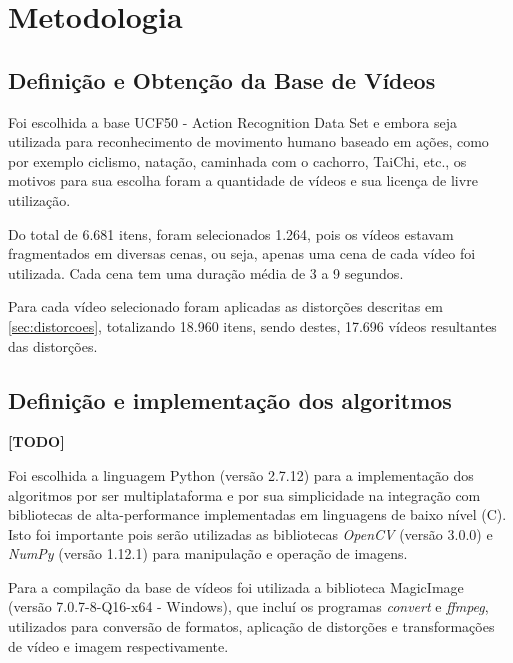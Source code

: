 
\chapter{Metodologia}
\label{chap:metodologia}


\section{Definição e Obtenção da Base de Vídeos}

Foi escolhida a base UCF50 - Action Recognition Data Set \citeauthor{reddy2013recognizing} e embora seja utilizada para reconhecimento de movimento humano baseado em ações, como por exemplo ciclismo, natação, caminhada com o cachorro, TaiChi, etc., os motivos para sua escolha foram a quantidade de vídeos e sua licença de livre utilização. 

Do total de 6.681 itens, foram selecionados 1.264, pois os vídeos estavam fragmentados em diversas cenas, ou seja, apenas uma cena de cada vídeo foi utilizada. Cada cena tem uma duração média de 3 a 9 segundos.

Para cada vídeo selecionado foram aplicadas as distorções descritas em \ref{sec:distorcoes}, totalizando 18.960 itens, sendo destes, 17.696 vídeos resultantes das distorções.

\section{Definição e implementação dos algoritmos}

\textbf{[TODO]}


Foi escolhida a linguagem Python (versão 2.7.12) para a implementação dos algoritmos por ser multiplataforma e  por sua simplicidade na integração com bibliotecas de alta-performance implementadas em linguagens de baixo nível (C). Isto foi importante pois serão utilizadas as bibliotecas \textit{OpenCV} (versão 3.0.0) e \textit{NumPy} (versão 1.12.1) para manipulação e operação de imagens.

Para a compilação da base de vídeos foi utilizada a biblioteca MagicImage (versão 7.0.7-8-Q16-x64 - Windows), que incluí os programas \textit{convert} e \textit{ffmpeg}, utilizados para conversão de formatos, aplicação de distorções e transformações de vídeo e imagem respectivamente.

